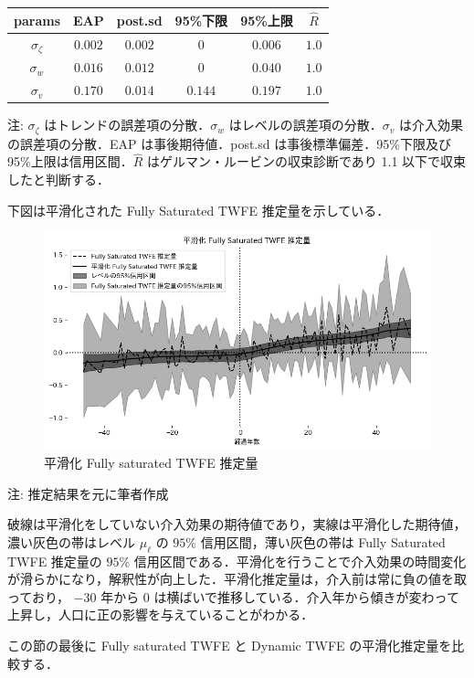 \begin{longtable}[]{@{}cccccc@{}}
\toprule
params & EAP & post.sd & 95\%下限 & 95\%上限 &
\(\hat{R}\)\tabularnewline
\midrule
\endhead
\(\sigma_{\zeta}\) & \(0.002\) & \(0.002\) & \(0\) & \(0.006\) &
\(1.0\)\tabularnewline
\(\sigma_{w}\) & \(0.016\) & \(0.012\) & \(0\) & \(0.040\) &
\(1.0\)\tabularnewline
\(\sigma_{v}\) & \(0.170\) & \(0.014\) & \(0.144\) & \(0.197\) &
\(1.0\)\tabularnewline
\bottomrule
\end{longtable}

注: \(\sigma_{\zeta}\) はトレンドの誤差項の分散．\(\sigma_{w}\)
はレベルの誤差項の分散．\(\sigma_{v}\) は介入効果の誤差項の分散．EAP
は事後期待値．post.sd は事後標準偏差．95\%下限及び
95\%上限は信用区間．\(\hat{R}\) はゲルマン・ルービンの収束診断であり 1.1
以下で収束したと判断する．

下図は平滑化された Fully Saturated TWFE 推定量を示している．

\begin{figure}
\centering
\includegraphics{../../docs/figures/fully_saturated_twfe/smoothed_ATT.png}
\caption{平滑化 Fully saturated TWFE 推定量}
\end{figure}

注: 推定結果を元に筆者作成

破線は平滑化をしていない介入効果の期待値であり，実線は平滑化した期待値，濃い灰色の帯はレベル
\(\mu_{\ell}\) の \(95\%\) 信用区間，薄い灰色の帯は Fully Saturated TWFE
推定量の \(95\%\)
信用区間である．平滑化を行うことで介入効果の時間変化が滑らかになり，解釈性が向上した．平滑化推定量は，介入前は常に負の値を取っており，
\(-30\) 年から \(0\)
は横ばいで推移している．介入年から傾きが変わって上昇し，人口に正の影響を与えていることがわかる．

この節の最後に Fully saturated TWFE と Dynamic TWFE
の平滑化推定量を比較する．

